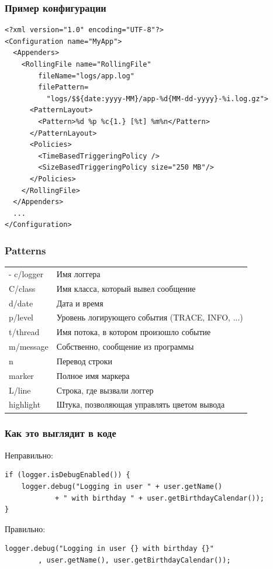 \documentclass[xetex,mathserif,serif]{beamer}
\begin{document}
	\begin{frame}[fragile]
		\frametitle{Пример конфигурации}
		\begin{footnotesize}
			\begin{verbatim}
<?xml version="1.0" encoding="UTF-8"?>
<Configuration name="MyApp">
  <Appenders>
    <RollingFile name="RollingFile" 
        fileName="logs/app.log"
        filePattern=
          "logs/$${date:yyyy-MM}/app-%d{MM-dd-yyyy}-%i.log.gz">
      <PatternLayout>
        <Pattern>%d %p %c{1.} [%t] %m%n</Pattern>
      </PatternLayout>
      <Policies>
        <TimeBasedTriggeringPolicy />
        <SizeBasedTriggeringPolicy size="250 MB"/>
      </Policies>
    </RollingFile>
  </Appenders>
  ...
</Configuration>
			\end{verbatim}
		\end{footnotesize}
\end{frame}

	\begin{frame}
		\frametitle{Patterns}
		\begin{tabu} {| X[0.2 l p] | X[1 l p] |}
			\tabucline-
			\everyrow{\tabucline-}
			c/logger   & Имя логгера                                    \\
			C/class    & Имя класса, который вывел сообщение            \\
			d/date     & Дата и время                                   \\
			p/level    & Уровень логирующего события (TRACE, INFO, ...) \\
			t/thread   & Имя потока, в котором произошло событие        \\
			m/message  & Собственно, сообщение из программы             \\
			n          & Перевод строки                                 \\
			marker     & Полное имя маркера                             \\
			L/line     & Строка, где вызвали логгер                     \\
			highlight  & Штука, позволяющая управлять цветом вывода     \\
		\end{tabu}
	\end{frame}

	\begin{frame}[fragile]
		\frametitle{Как это выглядит в коде}
		Неправильно:
		\begin{verbatim}
if (logger.isDebugEnabled()) {
    logger.debug("Logging in user " + user.getName() 
            + " with birthday " + user.getBirthdayCalendar());
}
		\end{verbatim}

		Правильно:
		\begin{verbatim}
logger.debug("Logging in user {} with birthday {}"
        , user.getName(), user.getBirthdayCalendar());
		\end{verbatim}
\end{frame}
\end{document}
